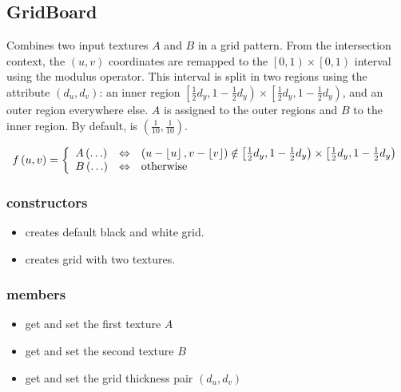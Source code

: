 \subsection{GridBoard}

Combines two input textures $A$ and $B$ in a grid pattern.  From the intersection context, the $\left(u, v\right)$ coordinates are remapped to the $\left[0, 1\right) \times \left[0, 1\right)$ interval using the modulus operator.  This interval is split in two regions using the  attribute $\left(d_u, d_v\right)$: an inner region $\left[\frac 1 2 d_y, 1-\frac 1 2 d_y\right) \times \left[\frac 1 2 d_y, 1-\frac 1 2 d_y\right)$, and an outer region everywhere else.  $A$ is assigned to the outer regions and $B$ to the inner region.  By default,  is $\left(\frac 1 {10}, \frac 1 {10}\right)$.

\begin{equation}
	f\left(u, v\right) = \left\{
		\begin{array}{lcl}
			A\left(\ldots\right) & \Leftrightarrow & 
				\left(u - \left\lfloor u \right\rfloor, v - \left\lfloor v \right\rfloor\right) \notin 
				\left[\frac 1 2 d_y, 1-\frac 1 2 d_y\right) \times 
				\left[\frac 1 2 d_y, 1-\frac 1 2 d_y\right)\\
			B\left(\ldots\right) & \Leftrightarrow & \textnormal{otherwise}
		\end{array}
	\right.
\end{equation}

\subsubsection*{constructors}
\begin{itemize}
	\item {} 
		creates default black and white grid.
	\item {} 
		creates grid with two textures.
\end{itemize}

\subsubsection*{members}
\begin{itemize}
	\item {} 
		get and set the first texture $A$
	\item {} 
		get and set the second texture $B$
	\item {} 
		get and set the grid thickness pair $\left(d_u, d_v\right)$
\end{itemize}



